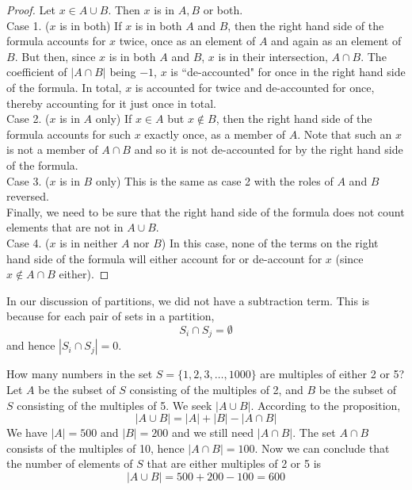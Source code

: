 \documentclass[handout]{ximera}
\begin{document}
\begin{proof}
Let $x \in A \cup B$.  Then $x$ is in $A, B$ or both.\\
Case 1. ($x$ is in both)
If $x$ is in both $A$ and $B$, then the right hand side of the formula accounts for $x$ twice, 
once as an element of $A$ and again as an element of $B$. But then, since $x$ is in 
both $A$ and $B$, $x$ is in their intersection, $A \cap B$.  
The coefficient of $|A \cap B|$ being $-1$, $x$ is ``de-accounted" for once in the 
right hand side of the formula.  In total, $x$ is accounted for twice and de-accounted for once, 
thereby accounting for it just once in total.\\
Case 2. ($x$ is in $A$ only)
If $x \in A$ but $x \notin B$, then the right hand side of the formula accounts 
for such $x$ exactly once, as a member of $A$.  Note that such an $x$ is not a 
member of $A \cap B$ and so it is not de-accounted for by the right hand side of the formula.\\
Case 3. ($x$ is in $B$ only)
This is the same as case 2 with the roles of $A$ and $B$ reversed.\\
Finally, we need to be sure that the right hand side of the formula does not count elements that are not in $A \cup B$.\\
Case 4. ($x$ is in neither $A$ nor $B$)
In this case, none of the terms on the right hand side of the formula will either account 
for or de-account for $x$ (since $x \notin A \cap B$ either).
\end{proof}


\begin{remark}
In our discussion of partitions, we did not have a subtraction term.  This is because for each pair of sets in a partition,
\[
S_i \cap S_j = \emptyset
\]
and hence $|S_i \cap S_j| = 0$.
\end{remark}


\begin{example}[example 1]
How many numbers in the set $S = \{1,2,3, \ldots, 1000\}$ are multiples of either 2 or 5?\\
Let $A$ be the subset of $S$ consisting of the multiples of 2, and $B$ be the subset of $S$ consisting of the multiples of 5.
We seek $|A \cup B|$. According to the proposition, 
\[
|A \cup B| = |A| + |B| - |A \cap B|
\]
We have $|A| =500$ and $|B| = 200$ and we still need $|A \cap B|$. The set $A \cap B$ consists of the multiples of 10, 
hence $|A \cap B| = 100$.  Now we can conclude that the number of elements of $S$ that are either multiples of 2 or 5 is
\[
|A \cup B| = 500 + 200 - 100 = 600
\]
\end{example}
\end{document}
